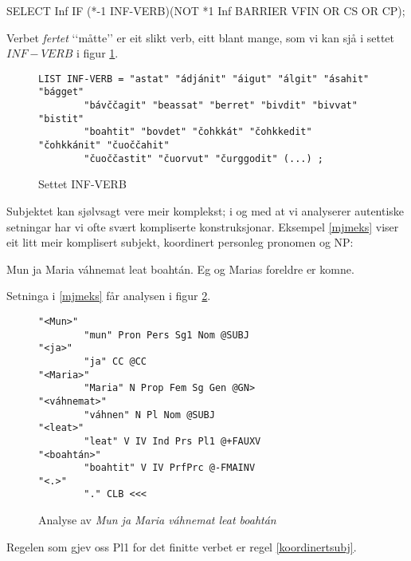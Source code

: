 \documentclass[a4paper,norsk]{article}
\begin{document}
\begin{example}\label{infverbregel}
SELECT Inf IF (*-1 INF-VERB)(NOT *1 Inf BARRIER VFIN OR CS OR CP);
\end{example}

Verbet \emph{fertet} ‘‘måtte’’ er eit slikt verb, eitt blant mange, som vi kan sjå i settet $INF-VERB$ i figur \ref{infverbsett}. %


\begin{figure}[htbp]
\begin{center}
\begin{verbatim}
LIST INF-VERB = "astat" "ádjánit" "áigut" "álgit" "ásahit" "bágget" 
		"bávččagit" "beassat" "berret" "bivdit" "bivvat" "bistit" 
		"boahtit" "bovdet" "čohkkát" "čohkkedit" "čohkkánit" "čuoččahit" 
		"čuoččastit" "čuorvut" "čurggodit" (...) ;
\end{verbatim}
\caption{Settet INF-VERB}
\label{infverbsett}
\end{center}
\end{figure}

Subjektet kan sjølvsagt vere meir komplekst; i og med at vi analyserer autentiske setningar har vi ofte svært kompliserte konstruksjonar. Eksempel \ref{mjmeks} viser eit litt meir komplisert subjekt, koordinert personleg pronomen og NP: %

\begin{example}\label{mjmeks}
\gll Mun ja Maria váhnemat  leat boahtán.
     Eg  og Marias foreldre er   komne.
\gln     
\glend
\end{example}%


Setninga i \ref{mjmeks} får analysen i figur \ref{mjam}. %

\begin{figure}[htbp]
\begin{center}
\begin{verbatim}
"<Mun>"
        "mun" Pron Pers Sg1 Nom @SUBJ
"<ja>"
        "ja" CC @CC
"<Maria>"
        "Maria" N Prop Fem Sg Gen @GN>
"<váhnemat>"
        "váhnen" N Pl Nom @SUBJ
"<leat>"
        "leat" V IV Ind Prs Pl1 @+FAUXV
"<boahtán>"
        "boahtit" V IV PrfPrc @-FMAINV
"<.>"
        "." CLB <<<
\end{verbatim}
\caption{Analyse av \textit{Mun ja Maria váhnemat leat boahtán}}
\label{mjam}
\end{center}
\end{figure}

 
Regelen som gjev oss Pl1 for det finitte verbet er regel  \ref{koordinertsubj}. %
 
\end{document}
